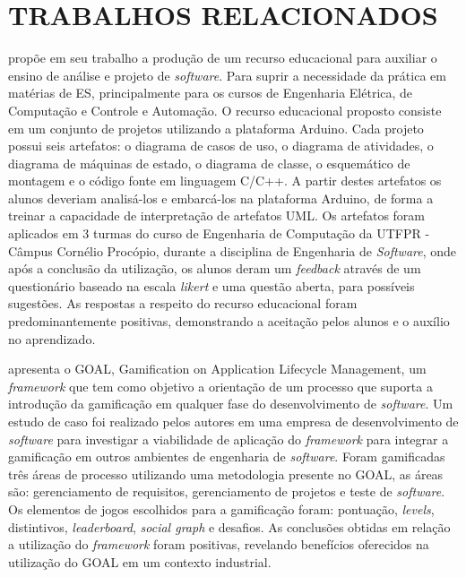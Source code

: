 \section{TRABALHOS RELACIONADOS}
\label{sec:trabalhos-relacionados}
 propõe em seu trabalho a produção de um recurso educacional para auxiliar o ensino de análise e projeto de \textit{software}. Para suprir a necessidade da prática em matérias de ES, principalmente para os cursos de Engenharia Elétrica, de Computação e Controle e Automação. O recurso educacional proposto consiste em um conjunto de projetos utilizando a plataforma Arduino. Cada projeto possui seis artefatos: o diagrama de casos de uso, o diagrama de atividades, o diagrama de máquinas de estado, o diagrama de classe, o esquemático de montagem e o código fonte em linguagem C/C++. A partir destes artefatos os alunos deveriam analisá-los e embarcá-los na plataforma Arduino, de forma a treinar a capacidade de interpretação de artefatos UML. Os artefatos foram aplicados em 3 turmas do curso de Engenharia de Computação da UTFPR - Câmpus Cornélio Procópio, durante a disciplina de Engenharia de \textit{Software}, onde após a conclusão da utilização, os alunos deram um \textit{feedback} através de um questionário baseado na escala \textit{likert} e uma questão aberta, para possíveis sugestões. As respostas a respeito do recurso educacional foram predominantemente positivas, demonstrando a aceitação pelos alunos e o auxílio no aprendizado.

 apresenta o GOAL, Gamification on Application Lifecycle Management, um \textit{framework} que tem como objetivo a orientação de um processo que suporta a introdução da gamificação em qualquer fase do desenvolvimento de \textit{software}. Um estudo de caso foi realizado pelos autores em uma empresa de desenvolvimento de \textit{software} para investigar a viabilidade de aplicação do \textit{framework} para integrar a gamificação em outros ambientes de engenharia de \textit{software}. Foram gamificadas três áreas de processo utilizando uma metodologia presente no GOAL, as áreas são: gerenciamento de requisitos, gerenciamento de projetos e teste de \textit{software}. Os elementos de jogos escolhidos para a gamificação foram: pontuação, \textit{levels}, distintivos, \textit{leaderboard}, \textit{social graph} e desafios. As conclusões obtidas em relação a utilização do \textit{framework} foram positivas, revelando benefícios oferecidos na utilização do GOAL em um contexto industrial. 


